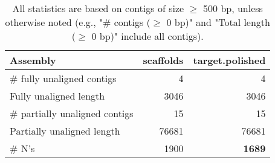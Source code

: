 \documentclass[12pt,a4paper]{article}
\begin{document}
\begin{table}[ht]
\begin{center}
\caption{All statistics are based on contigs of size $\geq$ 500 bp, unless otherwise noted (e.g., "\# contigs ($\geq$ 0 bp)" and "Total length ($\geq$ 0 bp)" include all contigs).}
\begin{tabular}{|l*{2}{|r}|}
\hline
Assembly & scaffolds & target.polished \\ \hline
\# fully unaligned contigs & 4 & 4 \\ \hline
Fully unaligned length & 3046 & 3046 \\ \hline
\# partially unaligned contigs & 15 & 15 \\ \hline
Partially unaligned length & 76681 & 76681 \\ \hline
\# N's & 1900 & {\bf 1689} \\ \hline
\end{tabular}
\end{center}
\end{table}
\end{document}
